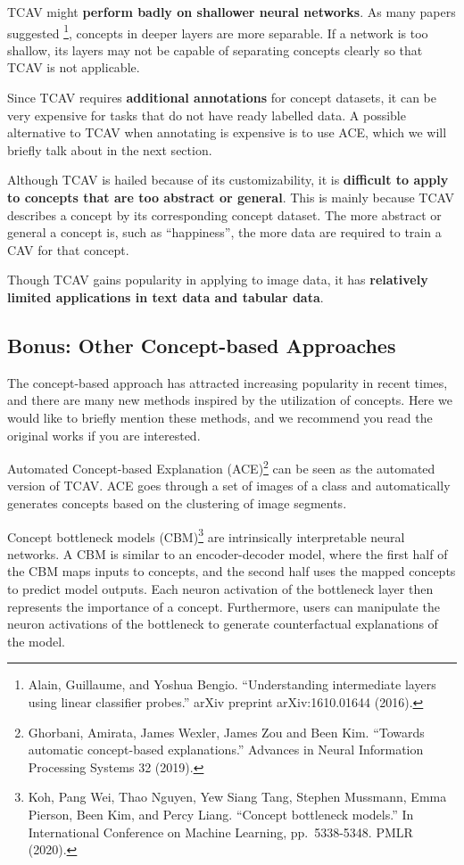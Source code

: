 \documentclass[
  11pt,
]{scrbook}
\begin{document}
TCAV might \textbf{perform badly on shallower neural networks}.
As many papers suggested \footnote{Alain, Guillaume, and Yoshua Bengio. ``Understanding intermediate layers using linear classifier probes.'' arXiv preprint arXiv:1610.01644 (2016).}, concepts in deeper layers are more separable.
If a network is too shallow, its layers may not be capable of separating concepts clearly so that TCAV is not applicable.

Since TCAV requires \textbf{additional annotations} for concept datasets, it can be very expensive for tasks that do not have ready labelled data.
A possible alternative to TCAV when annotating is expensive is to use ACE, which we will briefly talk about in the next section.

Although TCAV is hailed because of its customizability, it is \textbf{difficult to apply to concepts that are too abstract or general}.
This is mainly because TCAV describes a concept by its corresponding concept dataset.
The more abstract or general a concept is, such as ``happiness'', the more data are required to train a CAV for that concept.

Though TCAV gains popularity in applying to image data, it has \textbf{relatively limited applications in text data and tabular data}.

\hypertarget{bonus-other-concept-based-approaches}{%
\subsection{Bonus: Other Concept-based Approaches}\label{bonus-other-concept-based-approaches}}

The concept-based approach has attracted increasing popularity in recent times, and there are many new methods inspired by the utilization of concepts. Here we would like to briefly mention these methods, and we recommend you read the original works if you are interested.

Automated Concept-based Explanation (ACE)\footnote{Ghorbani, Amirata, James Wexler, James Zou and Been Kim. ``Towards automatic concept-based explanations.'' Advances in Neural Information Processing Systems 32 (2019).} can be seen as the automated version of TCAV.
ACE goes through a set of images of a class and automatically generates concepts based on the clustering of image segments.

Concept bottleneck models (CBM)\footnote{Koh, Pang Wei, Thao Nguyen, Yew Siang Tang, Stephen Mussmann, Emma Pierson, Been Kim, and Percy Liang. ``Concept bottleneck models.'' In International Conference on Machine Learning, pp.~5338-5348. PMLR (2020).} are intrinsically interpretable neural networks.
A CBM is similar to an encoder-decoder model, where the first half of the CBM maps inputs to concepts, and the second half uses the mapped concepts to predict model outputs.
Each neuron activation of the bottleneck layer then represents the importance of a concept.
Furthermore, users can manipulate the neuron activations of the bottleneck to generate counterfactual explanations of the model.
\end{document}

